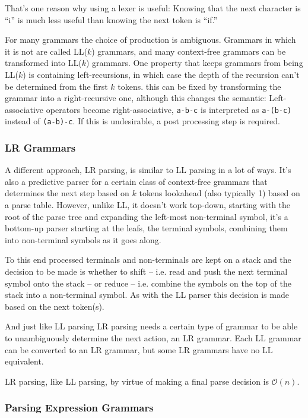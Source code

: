 			That's one reason why using a lexer is useful: Knowing that the next character is ``i'' is much less useful than knowing the next token is ``if.''
			
			For many grammars the choice of production is ambiguous. Grammars in which it is not are called LL($k$) grammars, and many context-free grammars can be transformed into LL($k$) grammars. One property that keeps grammars from being LL($k$) is containing left-recursions, in which case the depth of the recursion can't be determined from the first $k$ tokens. this can be fixed by transforming the grammar into a right-recursive one, although this changes the semantic: Left-associative operators become right-associative, \lstinline$a-b-c$ is interpreted as \lstinline$a-(b-c)$ instead of \lstinline$(a-b)-c$. If this is undesirable, a post processing step is required.
			
			\subsubsection{LR Grammars}
			
			A different approach, LR parsing, is similar to LL parsing in a lot of ways. It's also a predictive parser for a certain class of context-free grammars that determines the next step based on $k$ tokens lookahead (also typically 1) based on a parse table. However, unlike LL, it doesn't work top-down, starting with the root of the parse tree and expanding the left-most non-terminal symbol, it's a bottom-up parser starting at the leafs, the terminal symbols, combining them into non-terminal symbols as it goes along.
			
			To this end processed terminals and non-terminals are kept on a stack and the decision to be made is whether to shift -- i.e. read and push the next terminal symbol onto the stack -- or reduce -- i.e. combine the symbols on the top of the stack into a non-terminal symbol. As with the LL parser this decision is made based on the next token(s).
			
			And just like LL parsing LR parsing needs a certain type of grammar to be able to unambiguously determine the next action, an LR grammar. Each LL grammar can be converted to an LR grammar, but some LR grammars have no LL equivalent.
			
			LR parsing, like LL parsing, by virtue of making a final parse decision is $\mathcal{O}(n)$.
			
			\subsubsection{Parsing Expression Grammars}
			
